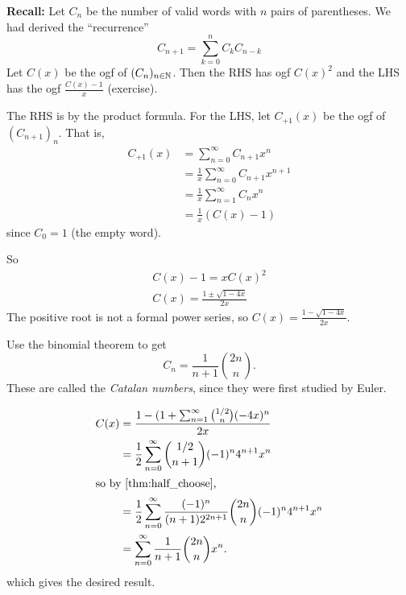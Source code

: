 \textbf{Recall:}
Let $C_n$ be the number of valid words with $n$ pairs of parentheses.
We had derived the ``recurrence'' \[
    C_{n+1} = \sum_{k=0}^{n} C_k C_{n-k}
\] Let $C(x)$ be the ogf of $(C_n)_{n \in \mathbb{N}}$.
Then the RHS has ogf $C(x)^2$ and the LHS has the ogf $\frac{C(x) - 1}{x}$
(exercise).
\begin{solution}
    The RHS is by the product formula.
    For the LHS, let $C_{+1}(x)$ be the ogf of $(C_{n+1})_n$.
    That is, \begin{align*}
        C_{+1}(x) &= \sum_{n = 0}^{\infty} C_{n+1} x^n \\
        &= \frac1x \sum_{n=0}^{\infty} C_{n+1} x^{n+1} \\
        &= \frac1x \sum_{n=1}^{\infty} C_n x^n \\
        &= \frac1x (C(x) - 1)
    \end{align*} since $C_0 = 1$ (the empty word).
\end{solution}

So \begin{align*}
    C(x) - 1 = x C(x)^2 \\
    C(x) = \frac{1 \pm \sqrt{1 - 4x}}{2x}
\end{align*}
The positive root is not a formal power series,
so $C(x) = \frac{1 - \sqrt{1 - 4x}}{2x}$.

\begin{exercise*}
    Use the binomial theorem to get \[
        C_n = \frac{1}{n+1} \binom{2n}{n}.
    \] These are called the \emph{Catalan numbers}, since they were first
    studied by Euler.
\end{exercise*}
\begin{solution}
    \begin{align*}
        C(x)
        &= \frac{1 - (1 + \sum_{n=1}^{\infty} \binom{1/2}{n} (-4x)^n}{2x} \\
        &= \frac12 \sum_{n=0}^{\infty} \binom{1/2}{n+1} (-1)^n 4^{n+1} x^n \\
        \intertext{so by \cref{thm:half_choose},}
        &= \frac12 \sum_{n=0}^{\infty} \frac{(-1)^n}{(n+1)2^{2n+1}} \binom{2n}{n}
            (-1)^n 4^{n+1} x^n \\
        &= \sum_{n=0}^{\infty} \frac{1}{n+1} \binom{2n}{n} x^n.
    \end{align*}
    which gives the desired result.
\end{solution}


